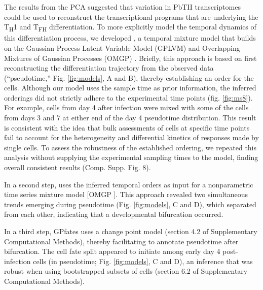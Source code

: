 The results from the PCA suggested that variation in PbTII transcriptomes could be used to reconstruct the transcriptional programs that are underlying the T\textsubscript{H}1 and T\textsubscript{FH} differentiation. To more explicitly model the temporal dynamics of this differentiation process, we developed , a temporal mixture model that builds on the Gaussian Process Latent Variable Model (GPLVM) \cite{Lawrence2006-it} and Overlapping Mixtures of Gaussian Processes (OMGP) \cite{Lazaro-Gredilla2012-ta}. Briefly, this approach is based on first reconstructing the differentiation trajectory from the observed data (“pseudotime,” Fig. \ref{fig:models}, A and B), thereby establishing an order for the cells. Although our model uses the sample time as prior information, the inferred orderings did not strictly adhere to the experimental time points (fig. \ref{fig:ms8}). For example, cells from day 4 after infection were mixed with some of the cells from days 3 and 7 at either end of the day 4 pseudotime distribution. This result is consistent with the idea that bulk assessments of cells at specific time points fail to account for the heterogeneity and differential kinetics of responses made by single cells. To assess the robustness of the established ordering, we repeated this analysis without supplying the experimental sampling times to the model, finding overall consistent results (Comp. Supp. Fig. 8).

In a second step,  uses the inferred temporal orders as input for a nonparametric time series mixture model [OMGP \cite{Lazaro-Gredilla2012-ta}]. This approach revealed two simultaneous trends emerging during pseudotime (Fig. \ref{fig:models}, C and D), which separated from each other, indicating that a developmental bifurcation occurred.

In a third step, GPfates uses a change point model (section 4.2 of Supplementary Computational Methods), thereby facilitating to annotate pseudotime after bifurcation. The cell fate split appeared to initiate among early day 4 post-infection cells (in pseudotime; Fig. \ref{fig:models}, C and D), an inference that was robust when using bootstrapped subsets of cells (section 6.2 of Supplementary Computational Methods).

